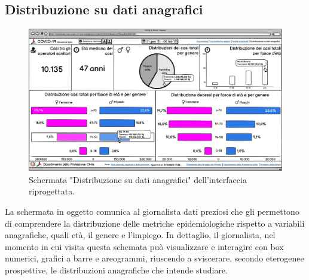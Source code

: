 \documentclass[../../main.tex]{subfiles}
\begin{document}
\subsection{Distribuzione su dati anagrafici}
\begin{figure}[h]
    \centering
    \includegraphics[width = \textwidth]{res/img/1 - Distribuzione su dati anagrafici}
    \caption{Schermata "Distribuzione su dati anagrafici" dell'interfaccia riprogettata.}
    \label{fig:distribuzione-dati-anagrafici}
\end{figure}
La schermata in oggetto comunica al giornalista dati preziosi che gli permettono di comprendere la distribuzione delle metriche epidemiologiche rispetto a variabili anagrafiche, quali età, il genere e l'impiego.
In dettaglio, il giornalista, nel momento in cui visita questa schemata può visualizzare e interagire con box numerici, grafici a barre e areogrammi, riuscendo a sviscerare, secondo eterogenee prospettive, le distribuzioni anagrafiche che intende studiare.
\end{document}
